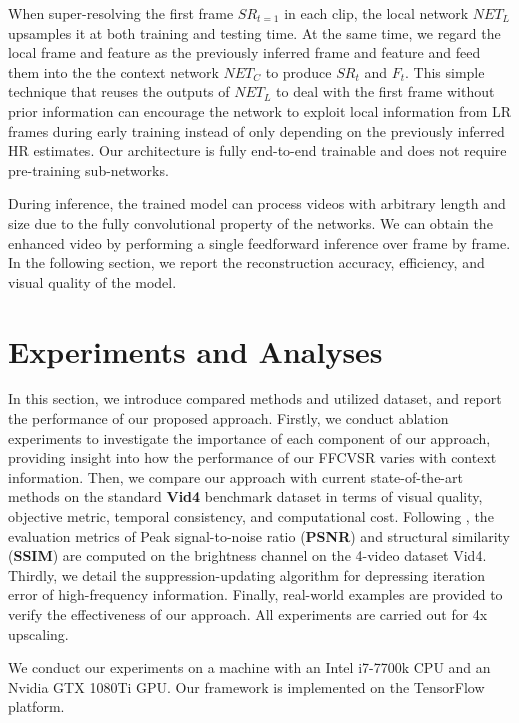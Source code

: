 \documentclass[letterpaper]{article} %
\begin{document}
When super-resolving the first frame $SR_{t=1}$ in each clip, the local network $NET_L$ upsamples it at both training and testing time. At the same time, we regard the local frame and feature as the previously inferred frame and feature and feed them into the the context network $NET_C$ to produce $SR_t$ and $F_t$. This simple technique that reuses the outputs of $NET_L$ to deal with the first frame without prior information can encourage the network to exploit local information from LR frames during early training instead of only depending on the previously inferred HR estimates. Our architecture is fully end-to-end trainable and does not require pre-training sub-networks.

During inference, the trained model can process videos with arbitrary length and size due to the fully convolutional property of the networks. We can obtain the enhanced video by performing a single feedforward inference over frame by frame. In the following section, we report the reconstruction accuracy, efficiency, and visual quality of the model.



\section{Experiments and Analyses}  \label{ExperimentsResults}


In this section, we introduce compared methods and utilized dataset, and report the performance of our proposed approach. Firstly, we conduct ablation experiments to investigate the importance of each component of our approach, providing insight into how the performance of our FFCVSR varies with context information. Then, we compare our approach with current state-of-the-art methods on the standard \textbf{Vid4} benchmark dataset \cite{BayesSR2011cvpr} in terms of visual quality, objective metric, temporal consistency, and computational cost. Following \cite{VESPCN2017cvpr}, the evaluation metrics of Peak signal-to-noise ratio (\textbf{PSNR}) and structural similarity (\textbf{SSIM}) are computed on the brightness channel on the 4-video dataset Vid4. Thirdly, we detail the suppression-updating algorithm for depressing iteration error of high-frequency information. Finally, real-world examples are provided to verify the effectiveness of our approach. All experiments are carried out for 4x upscaling.

We conduct our experiments on a machine with an Intel i7-7700k CPU and an Nvidia GTX 1080Ti GPU. Our framework is implemented on the TensorFlow platform.
\end{document}

